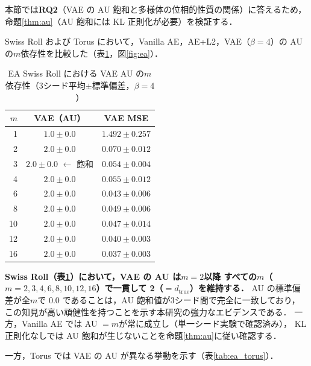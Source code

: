 \documentclass[12pt,a4paper]{jsarticle}
\newcommand{\dtrue}{d_{\mathrm{true}}}
\begin{document}
本節では\textbf{RQ2}（VAE の AU 飽和と多様体の位相的性質の関係）に答えるため，
命題\ref{thm:au}（AU 飽和には KL 正則化が必要）を検証する．

Swiss Roll および Torus において，Vanilla AE，AE+L2，VAE（$\beta=4$）の
AU の$m$依存性を比較した（表\ref{tab:ea}，図\ref{fig:ea}）．

\begin{table}[H]
\centering
\caption{EA Swiss Roll における VAE AU の$m$依存性（3シード平均$\pm$標準偏差，$\beta = 4$）}
\label{tab:ea}
\begin{tabular}{rcc}
\toprule
$m$ & VAE（AU） & VAE MSE \\
\midrule
1  & $1.0\pm0.0$ & $1.492\pm0.257$ \\
2  & $2.0\pm0.0$ & $0.070\pm0.012$ \\
3  & $\boldsymbol{2.0\pm0.0}$ $\leftarrow$ 飽和 & $0.054\pm0.004$ \\
4  & $\boldsymbol{2.0\pm0.0}$ & $0.055\pm0.012$ \\
6  & $\boldsymbol{2.0\pm0.0}$ & $0.043\pm0.006$ \\
8  & $\boldsymbol{2.0\pm0.0}$ & $0.049\pm0.006$ \\
10 & $\boldsymbol{2.0\pm0.0}$ & $0.047\pm0.014$ \\
12 & $\boldsymbol{2.0\pm0.0}$ & $0.040\pm0.003$ \\
16 & $\boldsymbol{2.0\pm0.0}$ & $0.037\pm0.003$ \\
\bottomrule
\end{tabular}
\end{table}

\textbf{Swiss Roll（表\ref{tab:ea}）において，VAE の AU は$m = 2$以降
すべての$m$（$m = 2, 3, 4, 6, 8, 10, 12, 16$）で一貫して 2（$= \dtrue$）を維持する．}
AU の標準偏差が全$m$で 0.0 であることは，AU 飽和値が3シード間で完全に一致しており，
この知見が高い頑健性を持つことを示す本研究の強力なエビデンスである．
一方，Vanilla AE では AU $= m$が常に成立し（単一シード実験で確認済み），
KL 正則化なしでは AU 飽和が生じないことを命題\ref{thm:au}に従い確認する．

一方，Torus では VAE の AU が異なる挙動を示す（表\ref{tab:ea_torus}）．
\end{document}
